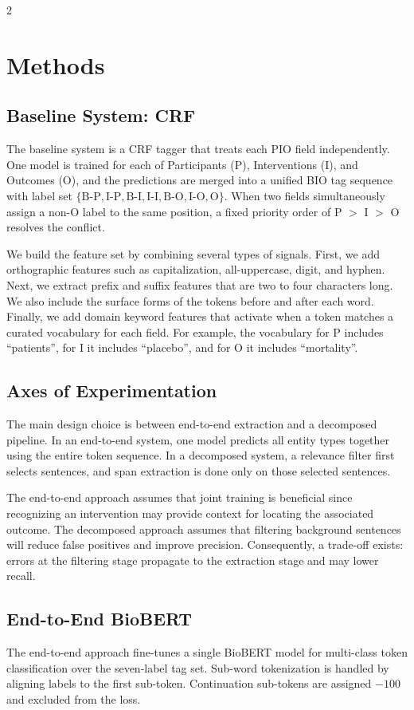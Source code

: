 \documentclass[11pt]{article}
\begin{document}
\begin{multicols}{2}

\section{Methods}
\subsection{Baseline System: CRF}
The baseline system is a CRF tagger that treats each PIO field independently. One model is trained for each of Participants (P), Interventions (I), and Outcomes (O), and the predictions are merged into a unified BIO tag sequence with label set $\{\text{B-P}, \text{I-P}, \text{B-I}, \text{I-I}, \text{B-O}, \text{I-O}, \text{O}\}$. When two fields simultaneously assign a non-O label to the same position, a fixed priority order of P $>$ I $>$ O resolves the conflict.

We build the feature set by combining several types of signals. First, we add orthographic features such as capitalization, all-uppercase, digit, and hyphen. Next, we extract prefix and suffix features that are two to four characters long. We also include the surface forms of the tokens before and after each word. Finally, we add domain keyword features that activate when a token matches a curated vocabulary for each field. For example, the vocabulary for P includes “patients”, for I it includes “placebo”, and for O it includes “mortality”.

\subsection{Axes of Experimentation}
The main design choice is between end-to-end extraction and a decomposed pipeline. In an end-to-end system, one model predicts all entity types together using the entire token sequence. In a decomposed system, a relevance filter first selects sentences, and span extraction is done only on those selected sentences.

The end-to-end approach assumes that joint training is beneficial since recognizing an intervention may provide context for locating the associated outcome. The decomposed approach assumes that filtering background sentences will reduce false positives and improve precision. Consequently, a trade-off exists: errors at the filtering stage propagate to the extraction stage and may lower recall.

\subsection{End-to-End BioBERT}
The end-to-end approach fine-tunes a single BioBERT model \cite{lee2020biobert} for multi-class token classification over the seven-label tag set. Sub-word tokenization is handled by aligning labels to the first sub-token. Continuation sub-tokens are assigned $-100$ and excluded from the loss.


\end{multicols}
\end{document}

